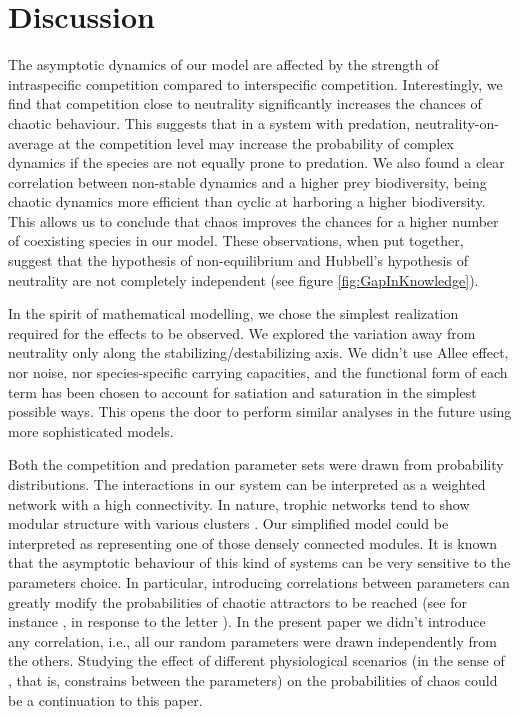 \section{Discussion}
\label{sec:Discussion}
The asymptotic dynamics of our model are affected by the strength of intraspecific competition compared to interspecific competition. Interestingly, we find that competition close to neutrality significantly increases the chances of chaotic behaviour. This suggests that in a system with predation, neutrality-on-average at the competition level may increase the probability of complex dynamics if the species are not equally prone to predation. We also found a clear correlation between non-stable dynamics and a higher prey biodiversity, being chaotic dynamics more efficient than cyclic at harboring a higher biodiversity. This allows us to conclude that chaos improves the chances for a higher number of coexisting species in our model. These observations, when put together, suggest that the hypothesis of non-equilibrium \citep{Huisman1999} and Hubbell's hypothesis of neutrality are not completely independent (see figure \ref{fig:GapInKnowledge}). 

In the spirit of mathematical modelling, we chose the simplest realization required for the effects to be observed. We explored the variation away from neutrality only along the stabilizing/destabilizing axis. We didn't use Allee effect, nor noise, nor species-specific carrying capacities, and the functional form of each term has been chosen to account for satiation and saturation in the simplest possible ways. This opens the door to perform similar analyses in the future using more sophisticated models.

Both the competition and predation parameter sets were drawn from probability distributions. The interactions in our system can be interpreted as a weighted network with a high connectivity. In nature, trophic networks tend to show modular structure with various clusters \citep{Thebault2010}. Our simplified model could be interpreted as representing one of those densely connected modules. It is known that the asymptotic behaviour of this kind of systems can be very sensitive to the parameters choice. In particular, introducing correlations between parameters can greatly modify the probabilities of chaotic attractors to be reached (see for instance \citet{Huisman2001}, in response to the letter \citet{Schippers2001}). In the present paper we didn't introduce any correlation, i.e., all our random parameters were drawn independently from the others. Studying the effect of different physiological scenarios (in the sense of \citet{Huisman2001}, that is, constrains between the parameters) on the probabilities of chaos could be a continuation to this paper.

